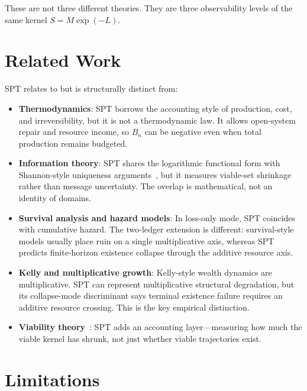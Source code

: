 \documentclass[11pt,a4paper]{article}
\begin{document}
These are not three different theories. They are three observability levels of the same kernel $S = M\exp(-L)$.

\section{Related Work}

SPT relates to but is structurally distinct from:
\begin{itemize}
\item \textbf{Thermodynamics}: SPT borrows the accounting style of production, cost, and irreversibility, but it is not a thermodynamic law. It allows open-system repair and resource income, so $B_n$ can be negative even when total production remains budgeted.
\item \textbf{Information theory}: SPT shares the logarithmic functional form with Shannon-style uniqueness arguments~\cite{shannon1948}, but it measures viable-set shrinkage rather than message uncertainty. The overlap is mathematical, not an identity of domains.
\item \textbf{Survival analysis and hazard models}: In loss-only mode, SPT coincides with cumulative hazard. The two-ledger extension is different: survival-style models usually place ruin on a single multiplicative axis, whereas SPT predicts finite-horizon existence collapse through the additive resource axis.
\item \textbf{Kelly and multiplicative growth}: Kelly-style wealth dynamics are multiplicative. SPT can represent multiplicative structural degradation, but its collapse-mode discriminant says terminal existence failure requires an additive resource crossing. This is the key empirical distinction.
\item \textbf{Viability theory}~\cite{aubin1991}: SPT adds an accounting layer---measuring how much the viable kernel has shrunk, not just whether viable trajectories exist.
\end{itemize}

\section{Limitations}
\end{document}
